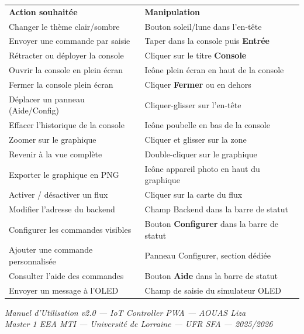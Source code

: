 \documentclass[a4paper,12pt]{article}
\begin{document}
\renewcommand{\arraystretch}{1.4}
\begin{center}
\begin{tabular}{m{6cm} m{8cm}}
\rowcolor{TableHeader}
\color{white}\bfseries Action souhait\'ee &
\color{white}\bfseries Manipulation \\
\rowcolor{white}       Changer le th\`eme clair/sombre   & Bouton soleil/lune dans l'en-t\^ete \\
\rowcolor{TableRowAlt} Envoyer une commande par saisie    & Taper dans la console puis \textbf{Entr\'ee} \\
\rowcolor{white}       R\'etracter ou d\'eployer la console & Cliquer sur le titre \textbf{Console} \\
\rowcolor{TableRowAlt} Ouvrir la console en plein \'ecran  & Ic\^one plein \'ecran en haut de la console \\
\rowcolor{white}       Fermer la console plein \'ecran     & Cliquer \textbf{Fermer} ou en dehors \\
\rowcolor{TableRowAlt} D\'eplacer un panneau (Aide/Config) & Cliquer-glisser sur l'en-t\^ete \\
\rowcolor{white}       Effacer l'historique de la console  & Ic\^one poubelle en bas de la console \\
\rowcolor{TableRowAlt} Zoomer sur le graphique             & Cliquer et glisser sur la zone \\
\rowcolor{white}       Revenir \`a la vue compl\`ete       & Double-cliquer sur le graphique \\
\rowcolor{TableRowAlt} Exporter le graphique en PNG        & Ic\^one appareil photo en haut du graphique \\
\rowcolor{white}       Activer / d\'esactiver un flux      & Cliquer sur la carte du flux \\
\rowcolor{TableRowAlt} Modifier l'adresse du backend       & Champ Backend dans la barre de statut \\
\rowcolor{white}       Configurer les commandes visibles   & Bouton \textbf{Configurer} dans la barre de statut \\
\rowcolor{TableRowAlt} Ajouter une commande personnalis\'ee & Panneau Configurer, section d\'edi\'ee \\
\rowcolor{white}       Consulter l'aide des commandes      & Bouton \textbf{Aide} dans la barre de statut \\
\rowcolor{TableRowAlt} Envoyer un message \`a l'OLED       & Champ de saisie du simulateur OLED \\
\end{tabular}
\end{center}

\vspace{16pt}
\begin{center}
  \color{TextGray}\small
  \textit{Manuel d'Utilisation v2.0 --- IoT Controller PWA --- AOUAS Liza}\\
  \textit{Master 1 EEA MTI --- Universit\'e de Lorraine --- UFR SFA --- 2025/2026}
\end{center}
\end{document}
